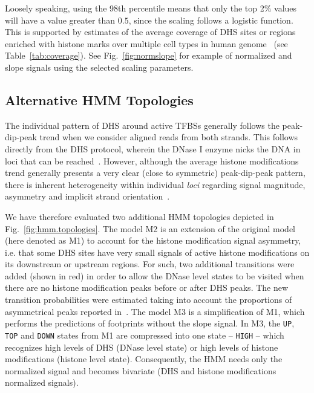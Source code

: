 \documentclass{bioinfo}
\begin{document}
Loosely speaking, using the 98th percentile means that only the top 2$\%$ values
will have a value greater than $0.5$, since the scaling follows a logistic function.
This is supported by estimates of the average coverage of DHS sites or regions enriched
with histone marks over multiple cell types in human genome~\citep{encode2012}
(see Table~\ref{tab:coverage}). See Fig.~\ref{fig:normslope} for example of normalized
and slope signals using the selected scaling parameters.

\subsection{Alternative HMM Topologies}
\label{sec:hmm.topology.test}

The individual pattern of DHS around active TFBSs generally follows the
peak-dip-peak trend when we consider aligned reads from both strands.
This follows directly from the DHS protocol, wherein the DNase I enzyme
nicks the DNA in loci that can be reached~\citep{crawford2006b,song2010,boyle2011}.
However, although the average histone modifications trend generally presents a very
clear (close to symmetric) peak-dip-peak pattern, there is inherent heterogeneity
within individual \emph{loci} regarding signal magnitude, asymmetry and implicit strand
orientation~\citep{kundaje2012,encode2012}. 

We have therefore evaluated two additional HMM topologies depicted in Fig.~\ref{fig:hmm.topologies}.
The model M2 is an extension of the original model (here denoted as M1) to
account for the histone modification signal asymmetry, i.e. that some DHS
sites have very small signals of active histone modifications
on its downstream or upstream regions. For such, two additional transitions were added (shown
in red) in order to allow the DNase level states to be visited when there are
no histone modification peaks before or after DHS peaks. The
new transition probabilities were estimated taking into account the proportions
of asymmetrical peaks reported in~\cite{kundaje2012}. The model M3 is a
simplification of M1, which performs the predictions of footprints without the
slope signal. In M3, the {\tt UP}, {\tt TOP} and {\tt DOWN} states from M1 are
compressed into one state -- {\tt HIGH} -- which recognizes high levels of DHS
(DNase level state) or high levels of histone modifications (histone level state).
Consequently, the HMM needs only the normalized signal and becomes
bivariate (DHS and histone modifications normalized signals).
\end{document}
